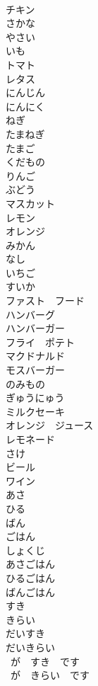 \documentclass[8pt]{extreport}
\begin{document}
\begin{CJK}{UTF8}{min}
\\	チキン	
\\	さかな	
\\	やさい	
\\	いも	
\\	トマト	
\\	レタス	
\\	にんじん	
\\	にんにく	
\\	ねぎ	
\\	たまねぎ	
\\	たまご	
\\	くだもの	
\\	りんご	
\\	ぶどう	
\\	マスカット	
\\	レモン	
\\	オレンジ	
\\	みかん	
\\	なし	
\\	いちご	
\\	すいか	
\\	ファスト　フード	
\\	ハンバーグ	
\\	ハンバーガー	
\\	フライ　ポテト	
\\	マクドナルド	
\\	モスバーガー	
\\	のみもの	
\\	ぎゅうにゅう	
\\	ミルクセーキ	
\\	オレンジ　ジュース	
\\	レモネード	
\\	さけ	
\\	ビール	
\\	ワイン	
\\	あさ	
\\	ひる	
\\	ばん	
\\	ごはん	
\\	しょくじ	
\\	あさごはん	
\\	ひるごはん	
\\	ばんごはん	
\\	すき	
\\	きらい	
\\	だいすき	
\\	だいきらい	
\\	~が　すき　です	
\\	~が　きらい　です	

\end{CJK}
\end{document}
